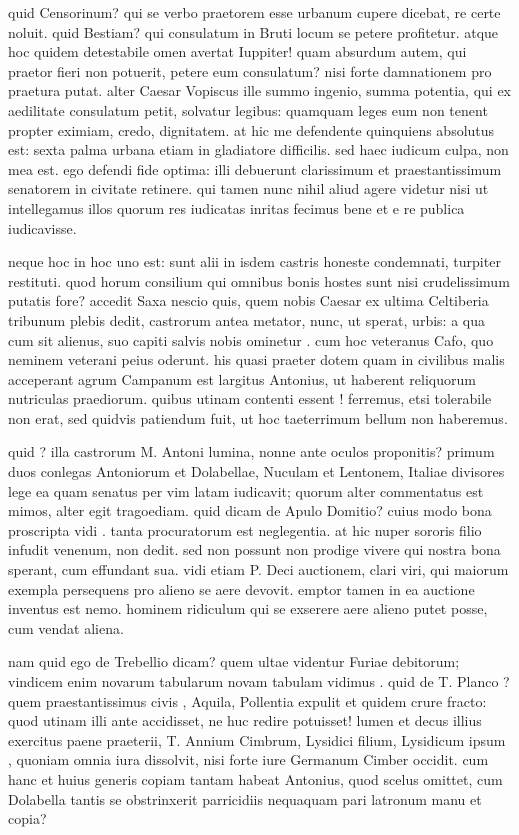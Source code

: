  quid Censorinum? qui se verbo praetorem esse urbanum cupere dicebat, re certe noluit. quid Bestiam? qui consulatum in Bruti locum se petere profitetur. atque hoc quidem detestabile omen avertat Iuppiter! quam absurdum autem, qui praetor fieri non potuerit, petere eum consulatum? nisi forte damnationem pro praetura putat. alter Caesar Vopiscus ille summo ingenio, summa potentia, qui ex aedilitate consulatum petit, solvatur legibus: quamquam leges eum non tenent propter eximiam, credo, dignitatem. at hic me defendente quinquiens absolutus est: sexta palma urbana etiam in gladiatore difficilis. sed haec iudicum culpa, non mea est. ego defendi fide optima: illi debuerunt clarissimum et praestantissimum senatorem in civitate retinere. qui tamen nunc nihil aliud agere videtur nisi ut intellegamus illos quorum res iudicatas inritas fecimus bene et e re publica iudicavisse.

 neque hoc in hoc uno est: sunt alii in isdem castris honeste condemnati, turpiter restituti. quod horum consilium qui omnibus bonis hostes sunt nisi crudelissimum putatis fore? accedit Saxa nescio quis, quem nobis Caesar ex ultima Celtiberia tribunum plebis dedit, castrorum antea metator, nunc, ut sperat, urbis: a qua cum sit alienus, suo capiti salvis nobis ominetur . cum hoc veteranus Cafo, quo neminem veterani peius oderunt. his quasi praeter dotem quam in civilibus malis acceperant agrum Campanum est largitus Antonius, ut haberent reliquorum nutriculas praediorum. quibus utinam contenti essent ! ferremus, etsi tolerabile non erat, sed quidvis patiendum fuit, ut hoc taeterrimum bellum non haberemus.

 quid ? illa castrorum M. Antoni lumina, nonne ante oculos proponitis? primum duos conlegas Antoniorum et Dolabellae, Nuculam et Lentonem, Italiae divisores lege ea quam senatus per vim latam iudicavit; quorum alter commentatus est mimos, alter egit tragoediam. quid dicam de Apulo Domitio? cuius modo bona proscripta vidi . tanta procuratorum est neglegentia. at hic nuper sororis filio infudit venenum, non dedit. sed non possunt non prodige vivere qui nostra bona sperant, cum effundant sua. vidi etiam P. Deci auctionem, clari viri, qui maiorum exempla persequens pro alieno se aere devovit. emptor tamen in ea auctione inventus est nemo. hominem ridiculum qui se exserere aere alieno putet posse, cum vendat aliena.

 nam quid ego de Trebellio dicam? quem ultae videntur Furiae debitorum; vindicem enim novarum tabularum novam tabulam vidimus . quid de T. Planco ? quem praestantissimus civis , Aquila, Pollentia expulit et quidem crure fracto: quod utinam illi ante accidisset, ne huc redire potuisset! lumen et decus illius exercitus paene praeterii, T. Annium Cimbrum, Lysidici filium, Lysidicum ipsum , quoniam omnia iura dissolvit, nisi forte iure Germanum Cimber occidit. cum hanc et huius generis copiam tantam habeat Antonius, quod scelus omittet, cum Dolabella tantis se obstrinxerit parricidiis nequaquam pari latronum manu et copia?


